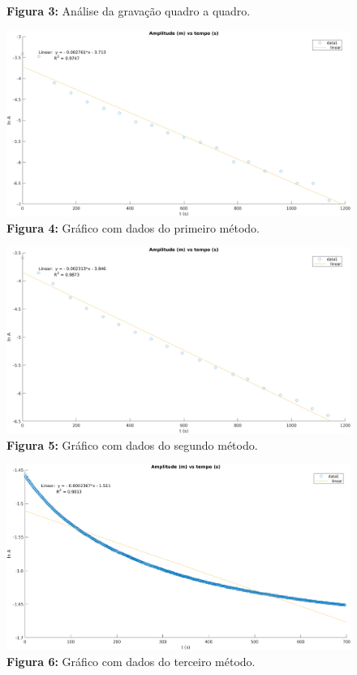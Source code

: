 \documentclass[a4paper, 12pt]{article}
\begin{document}
\begin{multicols}{2}
\begin{figure}[H]
				\captionsetup{labelformat=empty}
				\caption{\textbf{Figura 3:} Análise da gravação quadro a quadro.}
			\end{figure}
			\begin{figure}[H] \label{img:m1}
				\centering
				\includegraphics[scale=0.3]{./img/m1.png}
				\captionsetup{labelformat=empty}
				\caption{\textbf{Figura 4:} Gráfico com dados do primeiro método.}
			\end{figure}
			\begin{figure}[H] \label{img:m2}
				\centering
				\includegraphics[scale=0.3]{./img/m2.png}
				\captionsetup{labelformat=empty}
				\caption{\textbf{Figura 5:} Gráfico com dados do segundo método.}
			\end{figure}
			\begin{figure}[H] \label{img:m3}
				\centering
				\includegraphics[scale=0.3]{./img/m3.png}
				\captionsetup{labelformat=empty}
				\caption{\textbf{Figura 6:} Gráfico com dados do terceiro método.}
			\end{figure}
			

\end{multicols}
\end{document}
